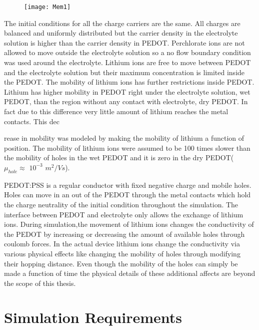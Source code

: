 \begin{figure}[!htp]
\centering
\texttt{[image: Mem1]}
\caption{} 
\label{MemStc}
\end{figure}

The initial conditions for all the charge carriers are the same. All charges are balanced and uniformly distributed but the carrier density in the electrolyte solution is higher than the carrier density in PEDOT. Perchlorate ions are not allowed to move outside the electrolyte solution so a no flow boundary condition was used around the electrolyte. Lithium ions are free to move between PEDOT and the electrolyte solution but their maximum concentration is limited inside the PEDOT. The mobility of lithium ions has further restrictions inside PEDOT. Lithium has higher mobility in PEDOT right under the electrolyte solution, wet PEDOT, than the region without any contact with electrolyte, dry PEDOT. In fact due to this difference very little amount of lithium reaches the metal contacts. This dec{rease in mobility was modeled by making the mobility of lithium a function of position. The mobility of lithium ions were assumed to be 100 times slower than the mobility of holes in the wet PEDOT and it is zero in the dry PEDOT( $\mu_{hole} \approx$ $10^{-3}$ $m^2/Vs$).  

PEDOT:PSS is a regular conductor with fixed negative charge and mobile holes. Holes can move in an out of the PEDOT through the metal contacts which hold the charge neutrality of the initial condition throughout the simulation. The interface between PEDOT and electrolyte only allows the exchange of lithium ions. During simulation,the movement of lithium ions changes the conductivity of the PEDOT by increasing or decreasing the amount of available holes through coulomb forces. In the actual device lithium ions change the conductivity via various physical effects like changing the mobility of holes through modifying their hopping distance. Even though the mobility of the holes can simply be made a function of time the physical details of these additional affects are beyond the scope of this thesis. 


\clearpage
\section{Simulation Requirements}

}
